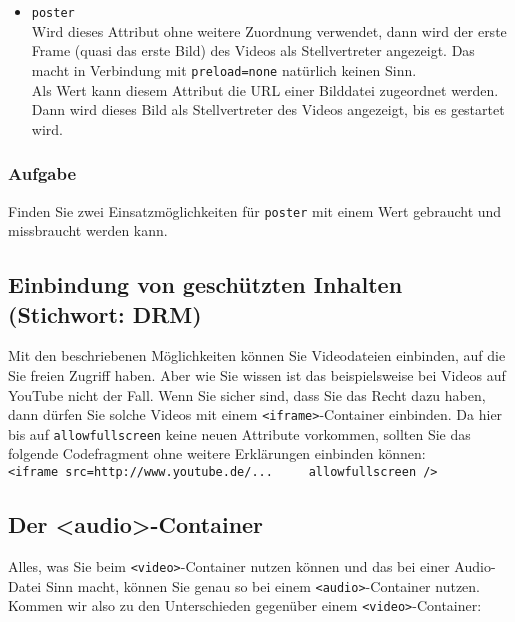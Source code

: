 \begin{itemize}
	\item \verb|poster|\\
	
	Wird dieses Attribut ohne weitere Zuordnung verwendet, dann wird der erste Frame (quasi das erste Bild) des Videos als Stellvertreter angezeigt. Das macht in Verbindung mit \verb|preload=none| natürlich keinen Sinn.\\
	
	Als Wert kann diesem Attribut die URL einer Bilddatei zugeordnet werden. Dann wird dieses Bild als Stellvertreter des Videos angezeigt, bis es gestartet wird.
\end{itemize}

\subsubsection{Aufgabe}

Finden Sie zwei Einsatzmöglichkeiten für \verb|poster| mit einem Wert gebraucht und missbraucht werden kann.

\subsection{Einbindung von geschützten Inhalten (Stichwort: DRM)}

Mit den beschriebenen Möglichkeiten können Sie Videodateien einbinden, auf die Sie freien Zugriff haben. Aber wie Sie wissen ist das beispielsweise bei Videos auf YouTube nicht der Fall. Wenn Sie sicher sind, dass Sie das Recht dazu haben, dann dürfen Sie solche Videos mit einem \verb|<iframe>|-Container einbinden. Da hier bis auf \verb|allowfullscreen| keine neuen Attribute vorkommen, sollten Sie das folgende Codefragment ohne weitere Erklärungen einbinden können:\\

\verb|<iframe src=http://www.youtube.de/...     allowfullscreen />|

\subsection{Der <audio>-Container}

Alles, was Sie beim \verb|<video>|-Container nutzen können und das bei einer Audio-Datei Sinn macht, können Sie genau so bei einem \verb|<audio>|-Container nutzen. Kommen wir also zu den Unterschieden gegenüber einem \verb|<video>|-Container:

